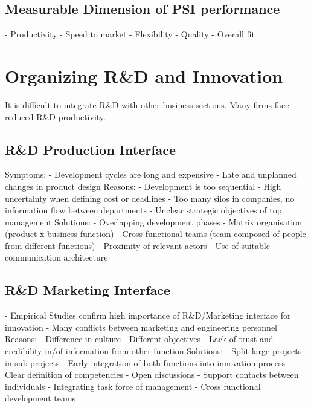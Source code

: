 \documentclass{scrartcl}
\begin{document}
\subsection*{Measurable Dimension of PSI performance}
- Productivity
- Speed to market
- Flexibility
- Quality
- Overall fit

\section*{Organizing R\&D and Innovation}
It is difficult to integrate R\&D with other business sections. Many firms face reduced R\&D productivity.
\subsection*{R\&D Production Interface}
Symptoms:
- Development cycles are long and expensive
- Late and unplanned changes in product design
Reasons:
- Development is too sequential
- High uncertainty when defining cost or deadlines
- Too many silos in companies, no information flow between departments
- Unclear strategic objectives of top management
Solutions:
- Overlapping development phases
- Matrix organisation (product x business function)
- Cross-functional teams (team composed of people from different functions)
- Proximity of relevant actors
- Use of suitable communication architecture
\subsection*{R\&D Marketing Interface}
- Empirical Studies confirm high importance of R\&D/Marketing interface for innovation
- Many conflicts between marketing and engineering personnel
Reasons:
- Difference in culture
- Different objectives
- Lack of trust and credibility in/of information from other function
Solutions:
- Split large projects in sub projects
- Early integration of both functions into innovation process
- Clear definition of competencies
- Open discussions
- Support contacts between individuals
- Integrating task force of management
- Cross functional development teams
\end{document}
